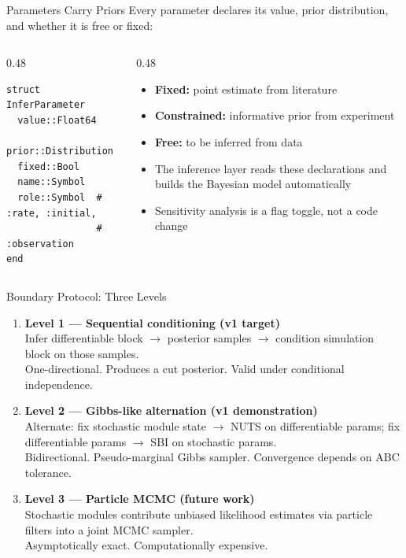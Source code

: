 \documentclass[aspectratio=169]{beamer}
\begin{document}
\begin{frame}{Parameters Carry Priors}
	Every parameter declares its value, prior distribution, and whether it is free or fixed:

	\bigskip
	\begin{columns}[T]
		\begin{column}{0.48\textwidth}
			\begin{lstlisting}[style=julia]
struct InferParameter
  value::Float64
  prior::Distribution
  fixed::Bool
  name::Symbol
  role::Symbol  # :rate, :initial,
                # :observation
end
			\end{lstlisting}
		\end{column}
		\begin{column}{0.48\textwidth}
			\begin{itemize}\itemsep6pt
				\item \textbf{Fixed:} point estimate from literature
				\item \textbf{Constrained:} informative prior from experiment
				\item \textbf{Free:} to be inferred from data
				\item The inference layer reads these declarations and builds the Bayesian model automatically
				\item Sensitivity analysis is a flag toggle, not a code change
			\end{itemize}
		\end{column}
	\end{columns}
\end{frame}

\begin{frame}[noframenumbering]{Boundary Protocol: Three Levels}
	\begin{enumerate}\itemsep8pt
		\item \textbf{Level 1 --- Sequential conditioning (v1 target)}\\
		Infer differentiable block $\to$ posterior samples $\to$ condition simulation block on those samples.\\
		{\small One-directional. Produces a cut posterior. Valid under conditional independence.}

		\item \textbf{Level 2 --- Gibbs-like alternation (v1 demonstration)}\\
		Alternate: fix stochastic module state $\to$ NUTS on differentiable params; fix differentiable params $\to$ SBI on stochastic params.\\
		{\small Bidirectional. Pseudo-marginal Gibbs sampler. Convergence depends on ABC tolerance.}

		\item \textbf{Level 3 --- Particle MCMC (future work)}\\
		Stochastic modules contribute unbiased likelihood estimates via particle filters into a joint MCMC sampler.\\
		{\small Asymptotically exact. Computationally expensive.}
	\end{enumerate}
\end{frame}
\end{document}
